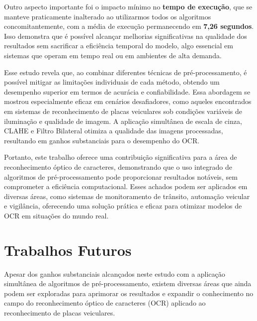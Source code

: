 \documentclass[conference]{IEEEtran}
\begin{document}
Outro aspecto importante foi o impacto mínimo no \textbf{tempo de execução}, que se manteve praticamente inalterado ao utilizarmos todos os algoritmos concomitantemente, com a média de execução permanecendo em \textbf{7,26 segundos}. Isso demonstra que é possível alcançar melhorias significativas na qualidade dos resultados sem sacrificar a eficiência temporal do modelo, algo essencial em sistemas que operam em tempo real ou em ambientes de alta demanda.

Esse estudo revela que, ao combinar diferentes técnicas de pré-processamento, é possível mitigar as limitações individuais de cada método, obtendo um desempenho superior em termos de acurácia e confiabilidade. Essa abordagem se mostrou especialmente eficaz em cenários desafiadores, como aqueles encontrados em sistemas de reconhecimento de placas veiculares sob condições variáveis de iluminação e qualidade de imagem. A aplicação simultânea de escala de cinza, CLAHE e Filtro Bilateral otimiza a qualidade das imagens processadas, resultando em ganhos substanciais para o desempenho do OCR.

Portanto, este trabalho oferece uma contribuição significativa para a área de reconhecimento óptico de caracteres, demonstrando que o uso integrado de algoritmos de pré-processamento pode proporcionar resultados notáveis, sem comprometer a eficiência computacional. Esses achados podem ser aplicados em diversas áreas, como sistemas de monitoramento de trânsito, automação veicular e vigilância, oferecendo uma solução prática e eficaz para otimizar modelos de OCR em situações do mundo real.

\section{Trabalhos Futuros}

Apesar dos ganhos substanciais alcançados neste estudo com a aplicação simultânea de algoritmos de pré-processamento, existem diversas áreas que ainda podem ser exploradas para aprimorar os resultados e expandir o conhecimento no campo do reconhecimento óptico de caracteres (OCR) aplicado ao reconhecimento de placas veiculares.
\end{document}
